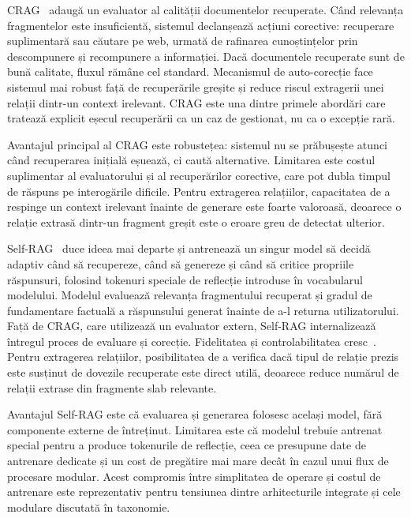 CRAG~\cite{yan2024crag} adaugă un evaluator al calității documentelor recuperate. Când relevanța fragmentelor este insuficientă, sistemul declanșează acțiuni corective: recuperare suplimentară sau căutare pe web, urmată de rafinarea cunoștințelor prin descompunere și recompunere a informației. Dacă documentele recuperate sunt de bună calitate, fluxul rămâne cel standard. Mecanismul de auto-corecție face sistemul mai robust față de recuperările greșite și reduce riscul extragerii unei relații dintr-un context irelevant. CRAG este una dintre primele abordări care tratează explicit eșecul recuperării ca un caz de gestionat, nu ca o excepție rară.

Avantajul principal al CRAG este robustețea: sistemul nu se prăbușește atunci când recuperarea inițială eșuează, ci caută alternative. Limitarea este costul suplimentar al evaluatorului și al recuperărilor corective, care pot dubla timpul de răspuns pe interogările dificile. Pentru extragerea relațiilor, capacitatea de a respinge un context irelevant înainte de generare este foarte valoroasă, deoarece o relație extrasă dintr-un fragment greșit este o eroare greu de detectat ulterior.

Self-RAG~\cite{asai2023self} duce ideea mai departe și antrenează un singur model să decidă adaptiv când să recupereze, când să genereze și când să critice propriile răspunsuri, folosind tokenuri speciale de reflecție introduse în vocabularul modelului. Modelul evaluează relevanța fragmentului recuperat și gradul de fundamentare factuală a răspunsului generat înainte de a-l returna utilizatorului. Față de CRAG, care utilizează un evaluator extern, Self-RAG internalizează întregul proces de evaluare și corecție. Fidelitatea și controlabilitatea cresc~\cite{asai2023self}. Pentru extragerea relațiilor, posibilitatea de a verifica dacă tipul de relație prezis este susținut de dovezile recuperate este direct utilă, deoarece reduce numărul de relații extrase din fragmente slab relevante.

Avantajul Self-RAG este că evaluarea și generarea folosesc același model, fără componente externe de întreținut. Limitarea este că modelul trebuie antrenat special pentru a produce tokenurile de reflecție, ceea ce presupune date de antrenare dedicate și un cost de pregătire mai mare decât în cazul unui flux de procesare modular. Acest compromis între simplitatea de operare și costul de antrenare este reprezentativ pentru tensiunea dintre arhitecturile integrate și cele modulare discutată în taxonomie.

